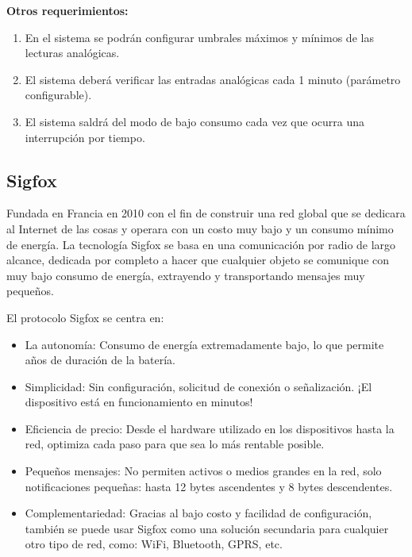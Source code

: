 \textbf{Otros requerimientos:}

\begin{enumerate}

	\item En el sistema se podrán configurar umbrales máximos y mínimos de las lecturas analógicas.

	\item El sistema deberá verificar las entradas analógicas cada 1 minuto (parámetro configurable).

	\item El sistema saldrá del modo de bajo consumo cada vez que ocurra una interrupción por tiempo.

\end{enumerate}


\subsection{Sigfox}
Fundada en Francia en 2010 con el fin de construir una red global que se dedicara al Internet de las cosas y operara con un costo muy bajo y un consumo mínimo de energía. La tecnología Sigfox se basa en una comunicación por radio de largo alcance, dedicada por completo a hacer que cualquier objeto se comunique con muy bajo consumo de energía, extrayendo y transportando mensajes muy pequeños.

El protocolo Sigfox se centra en: 
\begin{itemize}
    \item La autonomía: Consumo de energía extremadamente bajo, lo que permite años de duración de la batería.
    \item Simplicidad:  Sin configuración, solicitud de conexión o señalización. ¡El dispositivo está en funcionamiento en minutos!
    \item Eficiencia de precio: Desde el hardware utilizado en los dispositivos hasta la red, optimiza cada paso para que sea lo más rentable posible.
    \item Pequeños mensajes: No permiten activos o medios grandes en la red, solo notificaciones pequeñas: hasta 12 bytes ascendentes y 8 bytes descendentes.
    \item Complementariedad: Gracias al bajo costo y facilidad de configuración, también se puede usar Sigfox como una solución secundaria para cualquier otro tipo de red, como: WiFi, Bluetooth, GPRS, etc.
\end{itemize}

